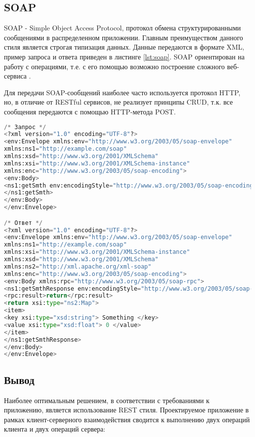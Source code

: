 \subsection{SOAP}

SOAP - Simple Object Access Protocol, протокол обмена структурированными сообщениями в распределенном приложении. Главным преимуществом данного стиля является строгая типизация данных. Данные передаются в формате XML, пример запроса и ответа приведен в листинге \ref{lst:soap}. SOAP ориентирован на работу с операциями, т.е. с его помощью возможно построение сложного веб-сервиса \cite{soap}. 

Для передачи SOAP-сообщений наиболее часто используется протокол HTTP, но, в отличие от RESTful сервисов, не реализует принципы CRUD, т.к. все сообщения передаются с помощью HTTP-метода POST.

\begin{lstlisting}[language=Python, 
label=lst:soap, 
caption={Пример запроса и ответа в SOAP стиле.}]
/* Запрос */
<?xml version="1.0" encoding="UTF-8"?>
<env:Envelope xmlns:env="http://www.w3.org/2003/05/soap-envelope" 
xmlns:ns1="http://example.com/soap" 
xmlns:xsd="http://www.w3.org/2001/XMLSchema" 
xmlns:xsi="http://www.w3.org/2001/XMLSchema-instance" 
xmlns:enc="http://www.w3.org/2003/05/soap-encoding">
<env:Body>
<ns1:getSmth env:encodingStyle="http://www.w3.org/2003/05/soap-encoding">
</ns1:getSmth>
</env:Body>
</env:Envelope>

/* Ответ */
<?xml version="1.0" encoding="UTF-8"?>
<env:Envelope xmlns:env="http://www.w3.org/2003/05/soap-envelope" 
xmlns:ns1="http://example.com/soap" 
xmlns:xsi="http://www.w3.org/2001/XMLSchema-instance" 
xmlns:xsd="http://www.w3.org/2001/XMLSchema" 
xmlns:ns2="http://xml.apache.org/xml-soap" 
xmlns:enc="http://www.w3.org/2003/05/soap-encoding">
<env:Body xmlns:rpc="http://www.w3.org/2003/05/soap-rpc">
<ns1:getSmthResponse env:encodingStyle="http://www.w3.org/2003/05/soap-encoding">
<rpc:result>return</rpc:result>
<return xsi:type="ns2:Map">
<item>
<key xsi:type="xsd:string"> Something </key>
<value xsi:type="xsd:float"> 0 </value>
</item>
</ns1:getSmthResponse>
</env:Body>
</env:Envelope>
\end{lstlisting}

\subsection{Вывод}

Наиболее оптимальным решением, в соответствии с требованиями к приложению, является использование REST стиля. Проектируемое приложение в рамках клиент-серверного взаимодействия сводится к выполнению двух операций клиента и двух операций сервера:

